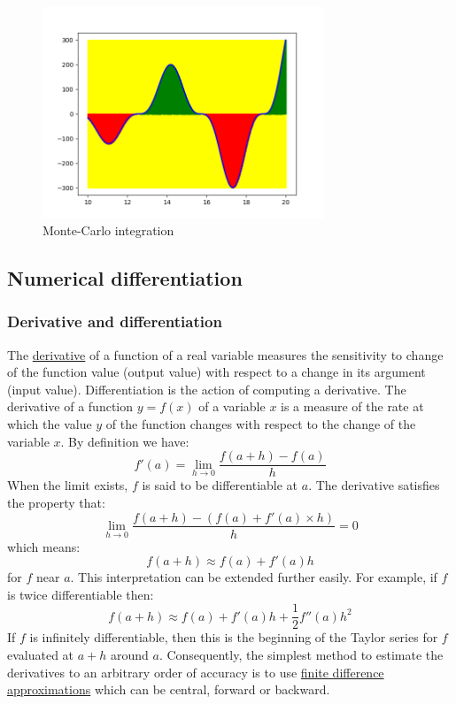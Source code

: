 \begin{figure}[H]
    \centering
    \includegraphics[width=0.75\textwidth]{figure/monte_carlo_inte.png}
    \caption{Monte-Carlo integration}
    \label{fig:mc_inte_1d}
\end{figure}



\subsection{Numerical differentiation}

\subsubsection{Derivative and differentiation}
The \href{https://en.wikipedia.org/wiki/Derivative}{derivative} of a function of a real variable measures the sensitivity to change of the function value (output value) with respect to a change in its argument (input value). Differentiation is the action of computing a derivative. The derivative of a function $y = f(x)$ of a variable $x$ is a measure of the rate at which the value $y$ of the function changes with respect to the change of the variable $x$. By definition we have:
\begin{equation}
	f'(a) = \lim_{h \rightarrow 0} \frac{f(a+h) - f(a)}{h}
\end{equation}
When the limit exists, $f$ is said to be differentiable at $a$. The derivative satisfies the property that:
\begin{equation}
	\lim_{h \rightarrow 0} \frac{f(a+h) - (f(a) + f'(a) \times h)}{h} = 0
\end{equation}
which means:
\begin{equation}
	f(a+h) \approx f(a) + f'(a) h
\end{equation}
for $f$ near $a$. This interpretation can be extended further easily. For example, if $f$ is twice differentiable then:
\begin{equation}
	f(a+h) \approx f(a) + f'(a) h + \frac{1}{2} f''(a) h^2
\end{equation}
If $f$ is infinitely differentiable, then this is the beginning of the Taylor series for $f$ evaluated at $a+h$ around $a$. Consequently, the simplest method to estimate the derivatives to an arbitrary order of accuracy is to use \href{https://en.wikipedia.org/wiki/Numerical_differentiation}{finite difference approximations} which can be central, forward or backward.



